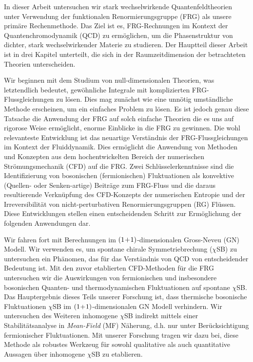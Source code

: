 \renewcommand{\twoDimensional}{\texorpdfstring{${(1 \mkern-3mu + \mkern-3mu 1)}$-dimensionalen}{(1+1)-dimensionalen}}
\renewcommand{\fourDimensional}{\texorpdfstring{${(3 \mkern-3mu + \mkern-3mu 1)}$-dimensionalen}{(3+1)-dimensionalen}}
\renewcommand{\csb}{\texorpdfstring{$\chi$SB}{χSB}}
%
In dieser Arbeit untersuchen wir stark wechselwirkende Quantenfeldtheorien unter Verwendung der funktionalen Renormierungsgruppe (FRG) als unsere primäre Rechenmethode.
Das Ziel ist es, FRG-Rechnungen im Kontext der Quantenchromodynamik (QCD) zu ermöglichen, um die Phasenstruktur von dichter, stark wechselwirkender Materie zu studieren.
Der Hauptteil dieser Arbeit ist in drei Kapitel unterteilt, die sich in der Raumzeitdimension der betrachteten Theorien unterscheiden.

Wir beginnen mit dem Studium von null-dimensionalen Theorien, was letztendlich bedeutet, gewöhnliche Integrale mit komplizierten FRG-Flussgleichungen zu lösen.
Dies mag zunächst wie eine unnötig umständliche Methode erscheinen, um ein einfaches Problem zu lösen. 
Es ist jedoch genau diese Tatsache \dash{} die Anwendung der FRG auf solch einfache Theorien \dash{} die es uns auf rigorose Weise ermöglicht, enorme Einblicke in die FRG zu gewinnen.
Die wohl relevanteste Entwicklung ist das neuartige Verständnis der FRG-Flussgleichungen im Kontext der Fluiddynamik.
Dies ermöglicht die Anwendung von Methoden und Konzepten aus dem hochentwickelten Bereich der numerischen Strömungsmechanik (CFD) auf die FRG.
Zwei Schlüsselerkenntnisse sind die Identifizierung von bosonischen (fermionischen) Fluktuationen als konvektive (Quellen- oder Senken-artige) Beiträge zum FRG-Fluss und die daraus resultierende Verknüpfung des CFD-Konzepts der numerischen Entropie und der Irreversibilität von nicht-perturbativen Renormierungsgruppen (RG) Flüssen.
Diese Entwicklungen stellen einen entscheidenden Schritt zur Ermöglichung der folgenden Anwendungen dar.

Wir fahren fort mit Berechnungen im \twoDimensional{} Gross-Neveu (GN) Modell.
Wir verwenden es, um spontane chirale Symmetriebrechung (\csb{}) zu untersuchen \dash{} ein Phänomen, das für das Verständnis von QCD von entscheidender Bedeutung ist.
Mit den zuvor etablierten CFD-Methoden für die FRG untersuchen wir die Auswirkungen von fermionischen und insbesondere bosonischen Quanten- und thermodynamischen Fluktuationen auf spontane \csb{}. 
Das Hauptergebnis dieses Teils unserer Forschung ist, dass thermische bosonische Fluktuationen \csb{} im \twoDimensional{} GN Modell verhindern.
Wir untersuchen des Weiteren inhomogene \csb{} indirekt mittels einer Stabilitätsanalyse in \textit{Mean-Field} (MF) Näherung, d.h. nur unter Berücksichtigung fermionischer Fluktuationen.
Mit unserer Forschung tragen wir dazu bei, diese Methode als robustes Werkzeug für sowohl qualitative als auch quantitative Aussagen über inhomogene \csb{} zu etablieren.

